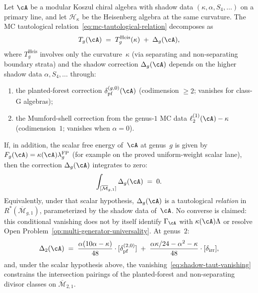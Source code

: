 \begin{theorem}%
\label{thm:shadow-tautological-relations}%
\ClaimStatusProvedHere
{}%
%
%
Let\/ $\cA$ be a modular Koszul chiral algebra with shadow
data $(\kappa, \alpha, S_4, \ldots)$ on a primary line,
and let\/ $\mathcal{H}_\kappa$ be the Heisenberg algebra
at the same curvature.  The MC tautological
relation~\eqref{eq:mc-tautological-relation} decomposes as
\begin{equation}\label{eq:shadow-taut-decomposition}
T_g(\cA) \;=\;
T_g^{\mathrm{Heis}}(\kappa)
\;+\;
\Delta_g(\cA),
\end{equation}
where $T_g^{\mathrm{Heis}}$ involves only the curvature\/~$\kappa$
\textup{(}via separating and non-separating boundary strata\textup{)}
and the shadow correction\/ $\Delta_g(\cA)$ depends on the higher
shadow data $\alpha, S_4, \ldots$ through\textup{:}
\begin{enumerate}[label=\textup{(\roman*)}]
\item the planted-forest correction
  $\delta_{\mathrm{pf}}^{(g,0)}(\cA)$
  \textup{(}codimension $\geq 2$;
  vanishes for class-G algebras\textup{)};
\item the Mumford-shell correction from the genus-$1$ MC data
  $\ell_2^{(1)}(\cA) - \kappa$
  \textup{(}codimension~$1$; vanishes when $\alpha = 0$\textup{)}.
\end{enumerate}
If, in addition, the scalar free energy of\/~$\cA$ at genus~$g$
is given by
$F_g(\cA)=\kappa(\cA)\lambda_g^{\mathrm{FP}}$
\textup{(}for example on the proved uniform-weight scalar
lane\textup{)}, then the correction\/ $\Delta_g(\cA)$ integrates
to zero:
\begin{equation}\label{eq:shadow-taut-vanishing}
\int_{[\overline{\mathcal{M}}_{g,1}]}
\Delta_g(\cA)
\;=\; 0.
\end{equation}
Equivalently, under that scalar hypothesis,
$\Delta_g(\cA)$ is a tautological
\emph{relation} in $R^*(\overline{\mathcal{M}}_{g,1})$,
parameterized by the shadow data of\/~$\cA$.
No converse is claimed: this conditional vanishing does not by
itself identify $\Gamma_{\cA}$ with $\kappa(\cA)\Lambda$ or
resolve Open Problem~\textup{\ref{op:multi-generator-universality}}.
At genus~$2$\textup{:}
\begin{equation}\label{eq:shadow-taut-genus2}
\Delta_2(\cA)
\;=\;
\frac{\alpha(10\alpha - \kappa)}{48}
\cdot [\delta_{\mathrm{pf}}^{(2,0)}]
\;+\;
\frac{\alpha\kappa/24 - \alpha^2 - \kappa}{48}
\cdot [\delta_{\mathrm{irr}}],
\end{equation}
and, under the scalar hypothesis above, the
vanishing~\eqref{eq:shadow-taut-vanishing}
constrains the intersection pairings of the planted-forest
and non-separating divisor classes on\/
$\overline{\mathcal{M}}_{2,1}$.
\end{theorem}

